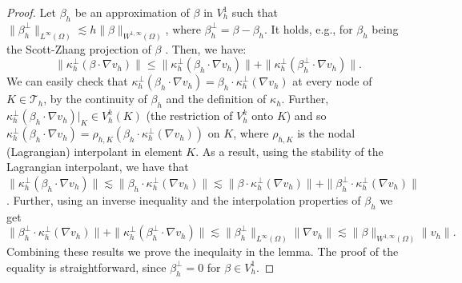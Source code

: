 \begin{proof}
Let $\beta_h$ be an approximation of $\beta$ in $V_h^1$ such that $\| \beta_h^\perp\|_{L^\infty(\Omega)} \lesssim h \|\beta \|_{W^{1,\infty}(\Omega)}$, where $\beta_h^\perp = \beta - \beta_h$. It holds, e.g., for $\beta_h$ being the Scott-Zhang projection of $\beta$ \cite{scott_finite_1990}. Then, we have:
$$\| \kappa_h^\perp (\beta \cdot \nabla v_h)\| \leq \| \kappa_h^\perp (\beta_h \cdot \nabla v_h)\| + 
\| \kappa_h^\perp (\beta_h^\perp \cdot \nabla v_h)\|.
$$
 We can easily check that $\kappa^\perp_h (\beta_h \cdot \nabla v_h) = \beta_h \cdot \kappa_h^\perp(\nabla v_h)$ at every node of $K \in \mathcal{T}_h$, by the continuity of $\beta_h$ and the definition of $\kappa_h$. Further, $\kappa^\perp_h (\beta_h \cdot \nabla v_h)|_K \in V^k_h(K)$ (the restriction of $V^k_h$ onto $K$) and so $\kappa^\perp_h (\beta_h \cdot \nabla v_h) = \rho_{h,K}(\beta_h \cdot \kappa_h^\perp(\nabla v_h))$ on $K$, where $\rho_{h,K}$ is the nodal (Lagrangian) interpolant in element $K$. As a result, using the stability of the Lagrangian interpolant, we have that $\|\kappa^\perp_h (\beta_h \cdot \nabla v_h)\| \lesssim \|\beta_h \cdot \kappa_h^\perp(\nabla v_h)\| \lesssim \| \beta \cdot \kappa_h^\perp(\nabla v_h)\| + \| \beta_h^\perp \cdot \kappa_h^\perp(\nabla v_h)\|$. Further, using an inverse inequality and the interpolation properties of $\beta_h$ we get
$$
\| \beta_h^\perp \cdot \kappa_h^\perp(\nabla v_h)\| + 
\| \kappa_h^\perp (\beta_h^\perp \cdot \nabla v_h)\| \lesssim \|\beta_h^\perp \|_{L^{\infty}(\Omega)} \|\nabla v_h\|
\lesssim \|\beta\|_{W^{1,\infty}(\Omega)} \|v_h\|.
$$
Combining these results we prove the inequlaity in the lemma. The proof of the equality is straightforward, since $\beta_h^\perp = 0$ for $\beta \in V_h^1$. 
%
\end{proof}

